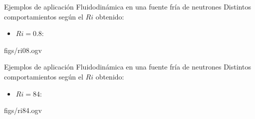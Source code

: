 \begin{frame}
{Ejemplos de aplicación}
{Fluidodinámica en una fuente fría de neutrones}
Distintos comportamientos según el $Ri$ obtenido:
\begin{itemize}
\item $Ri=0.8$:
\end {itemize}

\begin{center}
%
{figs/ri08.ogv} %
\end{center}

\end{frame}


\begin{frame}
{Ejemplos de aplicación}
{Fluidodinámica en una fuente fría de neutrones}
Distintos comportamientos según el $Ri$ obtenido:
\begin{itemize}
\item $Ri=84$:
\end {itemize}

\begin{center}
%
{figs/ri84.ogv} %
\end{center}

\end{frame}




